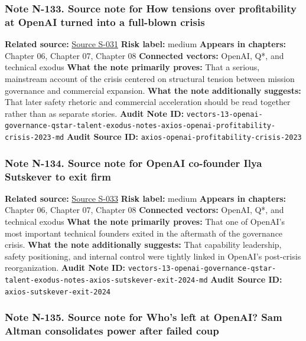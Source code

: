 \documentclass[
  american,
  11pt,
  letterpaper,
]{article}
\begin{document}
\subsubsection{Note N-133. Source note for How tensions over
profitability at OpenAI turned into a full-blown
crisis}\label{note-n-133-vectors-13-openai-governance-qstar-talent-exodus-notes-axios-openai-profitability-crisis-2023-md}

\textbf{Related source:}
\hyperref[source-s-031-how-tensions-over-profitability-at-openai-turned-into-a-full-blown-crisis]{Source
S-031} \textbf{Risk label:} medium \textbf{Appears in chapters:} Chapter
06, Chapter 07, Chapter 08 \textbf{Connected vectors:} OpenAI, Q*, and
technical exodus \textbf{What the note primarily proves:} That a
serious, mainstream account of the crisis centered on structural tension
between mission governance and commercial expansion. \textbf{What the
note additionally suggests:} That later safety rhetoric and commercial
acceleration should be read together rather than as separate stories.
\textbf{Audit Note ID:}
\texttt{vectors-13-openai-governance-qstar-talent-exodus-notes-axios-openai-profitability-crisis-2023-md}
\textbf{Audit Source ID:}
\texttt{axios-openai-profitability-crisis-2023}

\subsubsection{Note N-134. Source note for OpenAI co-founder Ilya
Sutskever to exit
firm}\label{note-n-134-vectors-13-openai-governance-qstar-talent-exodus-notes-axios-sutskever-exit-2024-md}

\textbf{Related source:}
\hyperref[source-s-033-openai-co-founder-ilya-sutskever-to-exit-firm]{Source
S-033} \textbf{Risk label:} medium \textbf{Appears in chapters:} Chapter
06, Chapter 07, Chapter 08 \textbf{Connected vectors:} OpenAI, Q*, and
technical exodus \textbf{What the note primarily proves:} That one of
OpenAI's most important technical founders exited in the aftermath of
the governance crisis. \textbf{What the note additionally suggests:}
That capability leadership, safety positioning, and internal control
were tightly linked in OpenAI's post-crisis reorganization.
\textbf{Audit Note ID:}
\texttt{vectors-13-openai-governance-qstar-talent-exodus-notes-axios-sutskever-exit-2024-md}
\textbf{Audit Source ID:} \texttt{axios-sutskever-exit-2024}

\subsubsection{Note N-135. Source note for Who's left at OpenAI? Sam
Altman consolidates power after failed
coup}\label{note-n-135-vectors-13-openai-governance-qstar-talent-exodus-notes-ft-openai-consolidates-power-2024-md}
\end{document}
